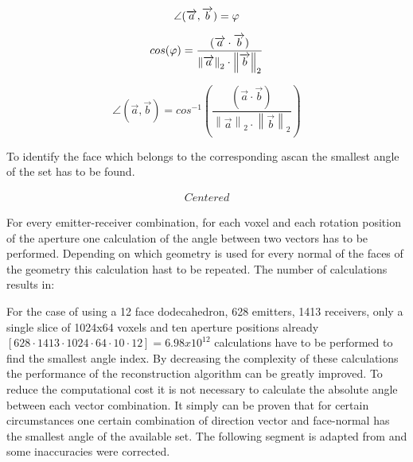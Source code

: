 \begin{equation}
\centering
\angle (\overrightarrow{a},\overrightarrow{b}) = \varphi
\label{eqation_angle}
\end{equation}


\begin{equation}
\centering
cos(\varphi )  =   \frac{(\overrightarrow{a} \cdot \overrightarrow{b})}{\left \| \overrightarrow{a} \right \|_2  \cdot \left \| \overrightarrow{b} \right \|_2}
\label{eqation_cos_phi}
\end{equation}

\begin{equation}
\angle (\overrightarrow{a},\overrightarrow{b}) = 
cos^{-1} \left (  
\frac{(\overrightarrow{a} \cdot \overrightarrow{b})}{\left \| \overrightarrow{a} \right \|_2  \cdot \left \| \overrightarrow{b} \right \|_2} 
\right )
\label{eqation_angle_final}
\end{equation}

To identify the face which belongs to the corresponding \ac{ascan} the smallest angle of the set has to be found.

\qquad


\begin{gather*}
Centered
\end{gather*} 


For every emitter-receiver combination, for each voxel and each rotation position of the aperture one calculation of the angle between two vectors has to be performed. Depending on which geometry is used for every normal of the faces of the geometry this calculation hast to be repeated. The number of calculations results in:


For the case of using a 12 face dodecahedron, 628 emitters, 1413 receivers, only a single slice of 1024x64 voxels and ten aperture positions already $[628 \cdot 1413 \cdot 1024 \cdot 64 \cdot 10 \cdot 12] = 6.98x10^{12}$ calculations have to be  performed to find the smallest angle index. By decreasing the complexity of these calculations the performance of the reconstruction algorithm can be greatly improved. To reduce the computational cost it is not necessary to calculate the absolute angle between each vector combination. It simply can be proven that for certain circumstances one certain combination of direction vector and face-normal has the smallest angle of the available set. The following segment is adapted from \cite{PatrickHucker2014EvaluationRuckstreumodells} and some inaccuracies were corrected.

